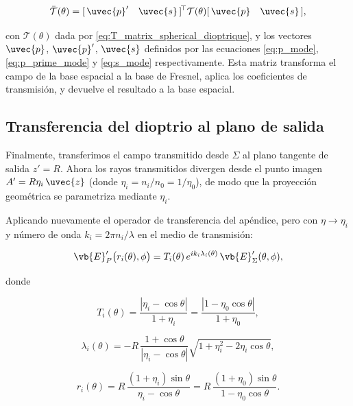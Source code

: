 \begin{equation}
\bar{\mathcal{T}}(\theta)
=
[\,\uvec{p}' \quad \uvec{s}\,]^{\!\top}
\mathcal{T}(\theta)
[\,\uvec{p} \quad \uvec{s}\,],
\label{eq:T_bar}
\end{equation}

con $\mathcal{T}(\theta)$ dada por \eqref{eq:T_matrix_spherical_dioptrique}, y los vectores $\uvec{p}$, $\uvec{p}'$, $\uvec{s}$ definidos por las ecuaciones \eqref{eq:p_mode}, \eqref{eq:p_prime_mode} y \eqref{eq:s_mode} respectivamente. Esta matriz transforma el campo de la base espacial a la base de Fresnel, aplica los coeficientes de transmisión, y devuelve el resultado a la base espacial.


\subsection{Transferencia del dioptrio al plano de salida}

Finalmente, transferimos el campo transmitido desde $\Sigma$ al plano tangente de salida $z' = R$. Ahora los rayos transmitidos divergen desde el punto imagen $A' = R\eta_i\,\uvec{z}$ (donde $\eta_i = n_i/n_0 = 1/\eta_0$), de modo que la proyección geométrica se parametriza mediante $\eta_i$.

Aplicando nuevamente el operador de transferencia del apéndice, pero con $\eta \to \eta_i$ y número de onda $k_i = 2\pi n_i/\lambda$ en el medio de transmisión:

\begin{equation}
\vb{E}'_P\bigl(r_i(\theta),\phi\bigr) = T_i(\theta)\, e^{i k_i \lambda_i(\theta)}\, \vb{E}'_\Sigma(\theta,\phi),
\label{eq:transferencia_sigma_a_plano}
\end{equation}

donde

\begin{equation}
T_i(\theta) = \frac{|\eta_i - \cos\theta|}{1 + \eta_i} = \frac{|1 - \eta_0 \cos\theta|}{1 + \eta_0},
\label{eq:Ti_definicion}
\end{equation}

\begin{equation}
\lambda_i(\theta) = -R\,\frac{1+\cos\theta}{|\eta_i-\cos\theta|}
\sqrt{1+\eta_i^2 - 2\eta_i\cos\theta},
\label{eq:lambdai_definicion}
\end{equation}

\begin{equation}
r_i(\theta) = R\,\frac{(1+\eta_i)\sin\theta}{\eta_i - \cos\theta} = R\,\frac{(1+\eta_0)\sin\theta}{1 - \eta_0\cos\theta}.
\label{eq:ri_proyeccion}
\end{equation}

